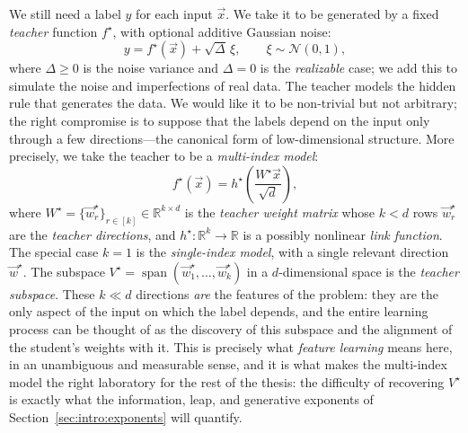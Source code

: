 We still need a label $y$ for each input $\vec{x}$.
We take it to be generated by a fixed \emph{teacher} function $f^\star$, with
optional additive Gaussian noise:
\begin{equation}
\label{eq:intro:teacher}
    y = f^\star(\vec{x}) + \sqrt{\Delta}\,\xi, \qquad \xi \sim \mathcal{N}(0,1),
\end{equation}
where $\Delta \geq 0$ is the noise variance and $\Delta = 0$ is the \emph{realizable}
case; we add this to simulate the noise and imperfections of real data.
The teacher models the hidden rule that generates the data.
We would like it to be non-trivial but not arbitrary; the right compromise is to
suppose that the labels depend on the input only through a few
directions---the canonical form of low-dimensional structure.
More precisely, we take the teacher to be a \emph{multi-index model}:
\begin{equation}
\label{eq:intro:multi-index}
    f^\star(\vec{x}) = h^\star\!\left(\frac{W^\star \vec{x}}{\sqrt{d}}\right),
\end{equation}
where $W^\star = \{\vec{w}^\star_r\}_{r \in [k]} \in \mathbb{R}^{k \times d}$ is the
\emph{teacher weight matrix} whose $k<d$ rows $\vec{w}^\star_r$ are the
\emph{teacher directions}, and $h^\star : \mathbb{R}^k \to \mathbb{R}$ is a possibly
nonlinear \emph{link function}.
The special case $k = 1$ is the \emph{single-index model}, with a single relevant
direction $\vec{w}^\star$.
The subspace $V^\star = \operatorname{span}(\vec{w}^\star_1, \ldots, \vec{w}^\star_k)$ in a
$d$-dimensional space is the \emph{teacher subspace}.
These $k \ll d$ directions \emph{are} the features of the problem: they are the only
aspect of the input on which the label depends, and the entire learning process can be
thought of as the discovery of this subspace and the alignment of the student's weights
with it.
This is precisely what \emph{feature learning} means here, in an unambiguous and
measurable sense, and it is what makes the multi-index model the right laboratory for the
rest of the thesis: the difficulty of recovering $V^\star$ is exactly what the
information, leap, and generative exponents of Section~\ref{sec:intro:exponents} will
quantify.

